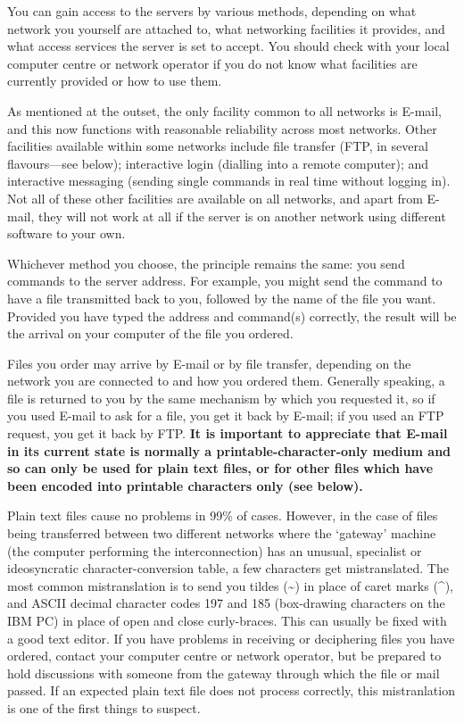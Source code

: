      You can gain access to the servers by various methods, depending on
     what network you yourself are attached to, what networking
     facilities it provides, and what access services the server is set
     to accept. You should check with your local computer centre or
     network operator if you do not know what facilities are currently
     provided or how to use them.

     As mentioned at the outset, the only facility common to all
     networks is E-mail, and this now functions with reasonable
     reliability across most networks. Other facilities available within
     some networks include file transfer (FTP, in several flavours---see
     below); interactive login (dialling into a remote computer); and
     interactive messaging (sending single commands in real time
     without logging in). Not all of these other facilities are
     available on all networks, and apart from E-mail, they will not
     work at all if the server is on another network using different
     software to your own.

     Whichever method you choose, the principle remains the same: you
     send commands to the server address. For example, you might send
     the command to have a file transmitted back to you, followed by the
     name of the file you want. Provided you have typed the address and
     command(s) correctly, the result will be the arrival on your
     computer of the file you ordered.


     Files you order may arrive by E-mail or by file transfer, depending
     on the network you are connected to and how you ordered them.
     Generally speaking, a file is returned to you by the same mechanism
     by which you requested it, so if you used E-mail to ask for a file,
     you get it back by E-mail; if you used an FTP request, you get it
     back by FTP. {\bf It is important to appreciate that E-mail in its
     current state is normally a printable-character-only medium and so
     can only be used for plain text files, or for other files which
     have been encoded into printable characters only (see below).}

     Plain text files cause no problems in 99\% of cases. However, in
     the case of files being transferred between two different networks
     where the `gateway' machine (the computer performing the
     interconnection) has an unusual, specialist or ideosyncratic
     character-conversion table, a few characters get mistranslated. The
     most common mistranslation is to send you tildes ({\tx\~{}}) in
     place of caret marks ({\tx\^{}}), and ASCII decimal character codes
     197 and 185 (box-drawing characters on the IBM PC) in place of open
     and close curly-braces. This can usually be fixed with a good text
     editor. If you have problems in receiving or deciphering files you
     have ordered, contact your computer centre or network operator, but
     be prepared to hold discussions with someone from the gateway
     through which the file or mail passed. If an expected plain text
     file does not process correctly, this mistranlation is one of the
     first things to suspect.

